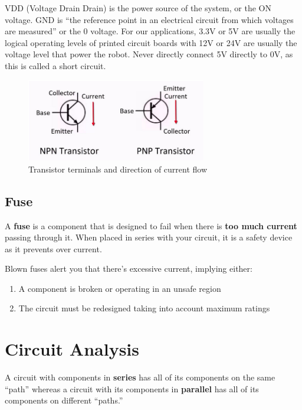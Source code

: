 \documentclass{article}
\begin{document}
VDD (Voltage Drain Drain) is the power source of the system, or the ON voltage. GND is “the reference point in an electrical circuit from which voltages are measured” or the 0 voltage. For our applications, 3.3V or 5V are usually the logical operating levels of printed circuit boards with 12V or 24V are usually the voltage level that power the robot. 
Never directly connect 5V directly to 0V, as this is called a short circuit. 

\begin{figure} [h]
    \centering
    \includegraphics[width=0.7\textwidth]{img/TransistorCurrent.png}
    \caption{Transistor terminals and direction of current flow}
    \label{fig:TranCurr}
\end{figure}

\subsection{Fuse}

A \textbf{fuse} is a component that is designed to fail when there is \textbf{too much current} passing through it. When placed in series with your circuit, it is a safety device as it prevents over current.

Blown fuses alert you that there’s excessive current, implying either: 
\begin{enumerate}
    \item A component is broken or operating in an unsafe region
    \item The circuit must be redesigned taking into account maximum ratings
\end{enumerate}

\section{Circuit Analysis}

A circuit with components in \textbf{series} has all of its components on the same “path” whereas a circuit with its components in \textbf{parallel} has all of its components on different “paths.” 
\end{document}
